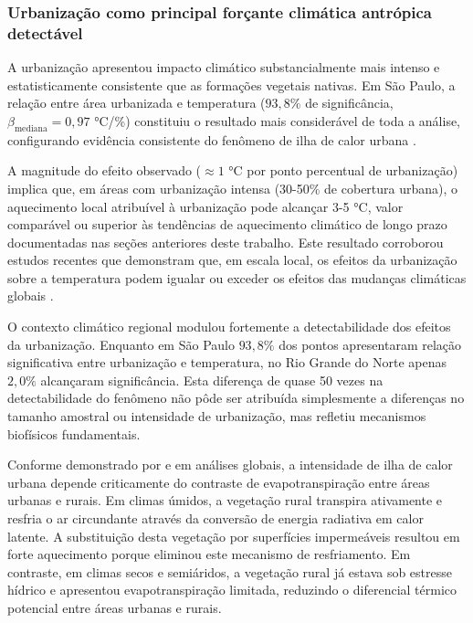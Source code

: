 \subsubsection*{Urbanização como principal forçante climática antrópica detectável}

A urbanização apresentou impacto climático substancialmente mais intenso e estatisticamente consistente que as formações vegetais nativas. Em São Paulo, a relação entre área urbanizada e temperatura ($93{,}8\%$ de significância, $\beta_{\text{mediana}} = 0{,}97$ °C/\%) constituiu o resultado mais considerável de toda a análise, configurando evidência consistente do fenômeno de ilha de calor urbana \citep{oke1982energetic, arnfield2003two, peng2012surface}.

A magnitude do efeito observado ($\approx 1$ °C por ponto percentual de urbanização) implica que, em áreas com urbanização intensa (30-50\% de cobertura urbana), o aquecimento local atribuível à urbanização pode alcançar 3-5 °C, valor comparável ou superior às tendências de aquecimento climático de longo prazo documentadas nas seções anteriores deste trabalho. Este resultado corroborou estudos recentes que demonstram que, em escala local, os efeitos da urbanização sobre a temperatura podem igualar ou exceder os efeitos das mudanças climáticas globais \citep{zhao2014strong, heaviside2017physical}.

O contexto climático regional modulou fortemente a detectabilidade dos efeitos da urbanização. Enquanto em São Paulo $93{,}8\%$ dos pontos apresentaram relação significativa entre urbanização e temperatura, no Rio Grande do Norte apenas $2{,}0\%$ alcançaram significância. Esta diferença de quase 50 vezes na detectabilidade do fenômeno não pôde ser atribuída simplesmente a diferenças no tamanho amostral ou intensidade de urbanização, mas refletiu mecanismos biofísicos fundamentais.

Conforme demonstrado por \cite{zhao2014strong} e \cite{manoli2019magnitude} em análises globais, a intensidade de ilha de calor urbana depende criticamente do contraste de evapotranspiração entre áreas urbanas e rurais. Em climas úmidos, a vegetação rural transpira ativamente e resfria o ar circundante através da conversão de energia radiativa em calor latente. A substituição desta vegetação por superfícies impermeáveis resultou em forte aquecimento porque eliminou este mecanismo de resfriamento. Em contraste, em climas secos e semiáridos, a vegetação rural já estava sob estresse hídrico e apresentou evapotranspiração limitada, reduzindo o diferencial térmico potencial entre áreas urbanas e rurais.


